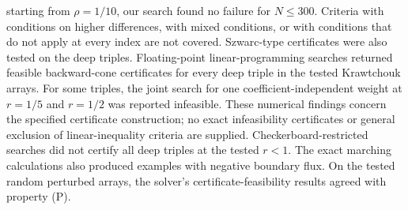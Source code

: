 \documentclass[twoside,10pt]{article}
\numberwithin{equation}{section}
\theoremstyle{slbody}
\theoremstyle{definition}
\theoremstyle{remark}
\begin{document}
starting from $\rho=1/10$, our search found no failure for $N\leq300$. Criteria with conditions on higher differences, with mixed conditions, or with conditions that do not apply at every index are not covered. Szwarc-type certificates were also tested on the deep triples. Floating-point linear-programming searches returned feasible backward-cone certificates for every deep triple in the tested Krawtchouk arrays. For some triples, the joint search for one coefficient-independent weight at $r=1/5$ and $r=1/2$ was reported infeasible. These numerical findings concern the specified certificate construction; no exact infeasibility certificates or general exclusion of linear-inequality criteria are supplied. Checkerboard-restricted searches did not certify all deep triples at the tested $r<1$. The exact marching calculations also produced examples with negative boundary flux. On the tested random perturbed arrays, the solver's certificate-feasibility results agreed with property (P).
\end{document}
